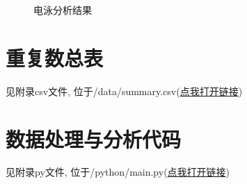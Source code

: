 \documentclass[AutoFakeBold]{LZUThesis}
\begin{document}
\begin{figure}[H]
    \centering

    \hfill
    \hfill
    \hfill
    
    \label{fig:anaegimg}
    \caption{电泳分析结果}
\end{figure}

\section{重复数总表}

见附录csv文件, 位于/data/summary.csv(\href{https://github.com/zehua0417/GeneticExperimentReport/blob/main/3_Human%20DNA%20Fingerprint%20Analysis/data/summary.csv}{点我打开链接})

\section{数据处理与分析代码}

见附录py文件, 位于/python/main.py(\href{https://github.com/zehua0417/GeneticExperimentReport/blob/main/3_Human%20DNA%20Fingerprint%20Analysis/python/main.py}{点我打开链接})



\end{document}

